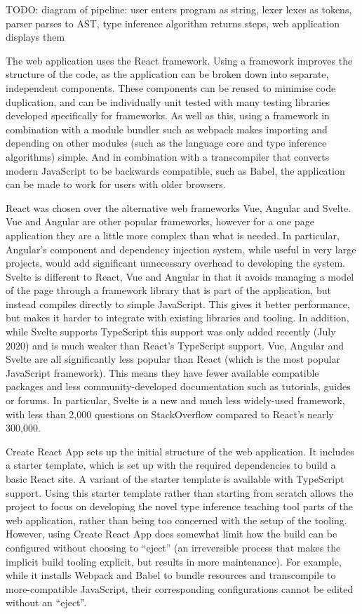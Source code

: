 \documentclass[a4paper,fleqn,twoside,12pt]{report}
\begin{document}
TODO: diagram of pipeline: user enters program as string, lexer lexes as tokens, parser parses to AST, type inference algorithm returns steps, web application displays them

The web application uses the React framework. Using a framework improves the structure of the code, as the application can be broken down into separate, independent components. These components can be reused to minimise code duplication, and can be individually unit tested with many testing libraries developed specifically for frameworks. As well as this, using a framework in combination with a module bundler such as webpack makes importing and depending on other modules (such as the language core and type inference algorithms) simple. And in combination with a transcompiler that converts modern JavaScript to be backwards compatible, such as Babel, the application can be made to work for users with older browsers.

React was chosen over the alternative web frameworks Vue, Angular and Svelte. Vue and Angular are other popular frameworks, however for a one page application they are a little more complex than what is needed. In particular, Angular’s component and dependency injection system, while useful in very large projects, would add significant unnecessary overhead to developing the system. Svelte is different to React, Vue and Angular in that it avoids managing a model of the page through a framework library that is part of the application, but instead compiles directly to simple JavaScript. This gives it better performance, but makes it harder to integrate with existing libraries and tooling. In addition, while Svelte supports TypeScript this support was only added recently (July 2020) and is much weaker than React’s TypeScript support. Vue, Angular and Svelte are all significantly less popular than React (which is the most popular JavaScript framework). This means they have fewer available compatible packages and less community-developed documentation such as tutorials, guides or forums. In particular, Svelte is a new and much less widely-used framework, with less than 2,000 questions on StackOverflow compared to React’s nearly 300,000.

Create React App sets up the initial structure of the web application. It includes a starter template, which is set up with the required dependencies to build a basic React site. A variant of the starter template is available with TypeScript support. Using this starter template rather than starting from scratch allows the project to focus on developing the novel type inference teaching tool parts of the web application, rather than being too concerned with the setup of the tooling. However, using Create React App does somewhat limit how the build can be configured without choosing to “eject” (an irreversible process that makes the implicit build tooling explicit, but results in more maintenance). For example, while it installs Webpack and Babel to bundle resources and transcompile to more-compatible JavaScript, their corresponding configurations cannot be edited without an “eject”.
\end{document}
